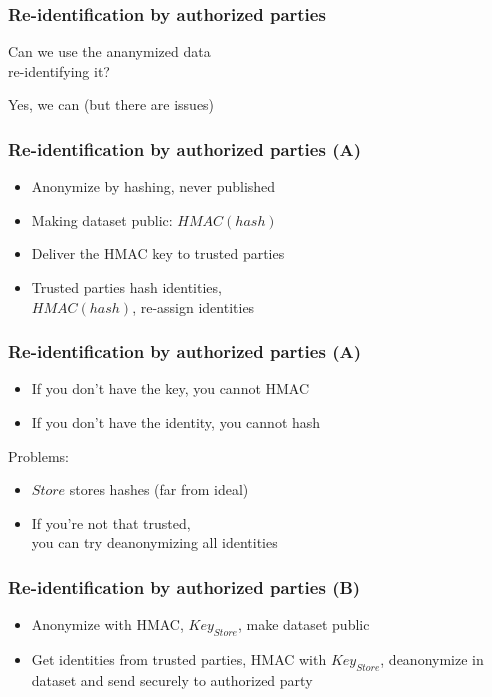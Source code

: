 \documentclass[17pt,aspectratio=169,hyperref={pdfusetitle,colorlinks,allcolors=olive}]{beamer}
\begin{document}
\begin{frame}[fragile]
  \frametitle{Re-identification by authorized parties}

  Can we use the ananymized data \\ re-identifying it? \\

  \begin{center}
    Yes, we can (but there are issues)
  \end{center}

\end{frame}


\begin{frame}[fragile]
  \frametitle{Re-identification by authorized parties (A)}

  \begin{itemize}
  \item Anonymize by hashing, never published
  \item Making dataset public: $HMAC(hash)$
  \item Deliver the HMAC key to trusted parties
  \item Trusted parties hash identities, \\
    $HMAC(hash)$, re-assign identities
  \end{itemize}
\end{frame}

\begin{frame}[fragile]
  \frametitle{Re-identification by authorized parties (A)}

  \begin{itemize}
  \item If you don't have the key, you cannot HMAC
  \item If you don't have the identity, you cannot hash
  \end{itemize}

  Problems:
  
  \begin{itemize}
  \item $Store$ stores hashes (far from ideal)
  \item If you're not that trusted, \\
    you can try deanonymizing all identities
  \end{itemize}
\end{frame}


\begin{frame}[fragile]
  \frametitle{Re-identification by authorized parties (B)}

  \begin{itemize}
  \item Anonymize with HMAC, $Key_{Store}$, make dataset public
  \item Get identities from trusted parties, HMAC with $Key_{Store}$, deanonymize in dataset and send securely to authorized party
  \end{itemize}

\end{frame}
\end{document}
